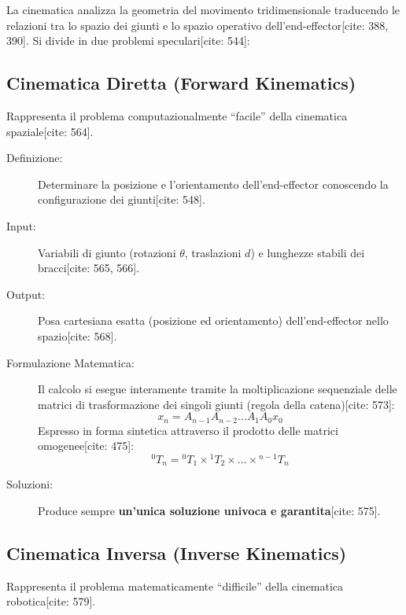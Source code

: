 La cinematica analizza la geometria del movimento tridimensionale traducendo le relazioni tra lo spazio dei giunti e lo spazio operativo dell'end-effector[cite: 388, 390]. Si divide in due problemi speculari[cite: 544]:

\subsection{Cinematica Diretta (Forward Kinematics)}

Rappresenta il problema computazionalmente ``facile'' della cinematica spaziale[cite: 564].

\begin{description}
    \item[Definizione:] Determinare la posizione e l'orientamento dell'end-effector conoscendo la configurazione dei giunti[cite: 548].
    \item[Input:] Variabili di giunto (rotazioni $\theta$, traslazioni $d$) e lunghezze stabili dei bracci[cite: 565, 566].
    \item[Output:] Posa cartesiana esatta (posizione ed orientamento) dell'end-effector nello spazio[cite: 568].
    \item[Formulazione Matematica:] Il calcolo si esegue interamente tramite la moltiplicazione sequenziale delle matrici di trasformazione dei singoli giunti (regola della catena)[cite: 573]:
          \begin{equation}
              x_n = A_{n-1}A_{n-2}\dots A_1A_0x_0
          \end{equation}
          Espresso in forma sintetica attraverso il prodotto delle matrici omogenee[cite: 475]:
          \begin{equation}
              {}^0T_n = {}^0T_1 \times {}^1T_2 \times \dots \times {}^{n-1}T_n
          \end{equation}
    \item[Soluzioni:] Produce sempre \textbf{un'unica soluzione univoca e garantita}[cite: 575].
\end{description}

\subsection{Cinematica Inversa (Inverse Kinematics)}

Rappresenta il problema matematicamente ``difficile'' della cinematica robotica[cite: 579].

